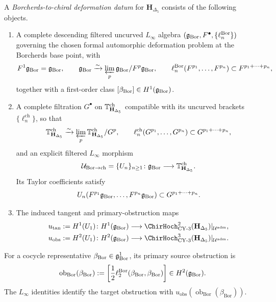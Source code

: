\begin{definition}
\label{def:borcherds-to-chiral-deformation-datum}
A \emph{Borcherds-to-chiral deformation datum} for
$\mathbf H_{\Delta_5}$ consists of the following objects.
\begin{enumerate}[label=\textup{(\roman*)}]
\item A complete descending filtered uncurved $L_\infty$ algebra
$(\mathfrak g_{\mathrm{Bor}},F^\bullet,\{\ell_n^{\mathrm{Bor}}\})$ governing the chosen
formal automorphic deformation problem at the Borcherds base point,
with
\[
 F^1\mathfrak g_{\mathrm{Bor}}=\mathfrak g_{\mathrm{Bor}},
 \qquad
 \mathfrak g_{\mathrm{Bor}}\xrightarrow{\sim}\varprojlim_p\mathfrak g_{\mathrm{Bor}}/F^p\mathfrak g_{\mathrm{Bor}},
 \qquad
 \ell_n^{\mathrm{Bor}}(F^{p_1},\ldots,F^{p_n})
 \subset F^{p_1+\cdots+p_n},
\]
together with a first-order class
$[\beta_{\mathrm{Bor}}]\in H^1(\mathfrak g_{\mathrm{Bor}})$.
\item A complete filtration $G^\bullet$ on
$\mathbb T_{\mathbf H_{\Delta_5}}^{\mathrm{ch}}$ compatible with its
uncurved brackets $\{\ell_n^{\mathrm{ch}}\}$, so that
\[
 \mathbb T_{\mathbf H_{\Delta_5}}^{\mathrm{ch}}
 \xrightarrow{\sim}
 \varprojlim_p
 \mathbb T_{\mathbf H_{\Delta_5}}^{\mathrm{ch}}/G^p,
 \qquad
 \ell_n^{\mathrm{ch}}(G^{p_1},\ldots,G^{p_n})
 \subset G^{p_1+\cdots+p_n},
\]
and an explicit filtered $L_\infty$ morphism
\begin{equation}
\label{eq:chi3-derived-deformation-classified}
 \mathcal U_{\mathrm{Bor}\to\mathrm{ch}}
 =\{U_n\}_{n\geq1}\colon
 \mathfrak g_{\mathrm{Bor}}\longrightarrow
 \mathbb T_{\mathbf H_{\Delta_5}}^{\mathrm{ch}}.
\end{equation}
Its Taylor coefficients satisfy
\[
 U_n(F^{p_1}\mathfrak g_{\mathrm{Bor}},\ldots,F^{p_n}\mathfrak g_{\mathrm{Bor}})
 \subset G^{p_1+\cdots+p_n}.
\]
\item The induced tangent and primary-obstruction maps
\begin{align*}
 u_{\mathrm{tan}}
 &:=H^1(U_1)\colon
 H^1(\gBor)\longrightarrow
 \ChirHoch^2_{\mathrm{CY\text{-}3}}(\mathbf H_{\Delta_5})|_{\Uadm},\\
 u_{\mathrm{obs}}
 &:=H^2(U_1)\colon
 H^2(\gBor)\longrightarrow
 \ChirHoch^3_{\mathrm{CY\text{-}3}}(\mathbf H_{\Delta_5})|_{\Uadm}.
\end{align*}
\end{enumerate}
For a cocycle representative $\beta_{\mathrm{Bor}}\in\mathfrak g_{\mathrm{Bor}}^1$, its
primary source obstruction is
\[
 \operatorname{ob}_{\mathrm{Bor}}(\beta_{\mathrm{Bor}})
 :=
 \left[\frac12\ell^{\mathrm{Bor}}_2
 (\beta_{\mathrm{Bor}},\beta_{\mathrm{Bor}})\right]
 \in H^2(\mathfrak g_{\mathrm{Bor}}).
\]
The $L_\infty$ identities identify the target obstruction with
$u_{\mathrm{obs}}(\operatorname{ob}_{\mathrm{Bor}}
(\beta_{\mathrm{Bor}}))$.
\end{definition}

